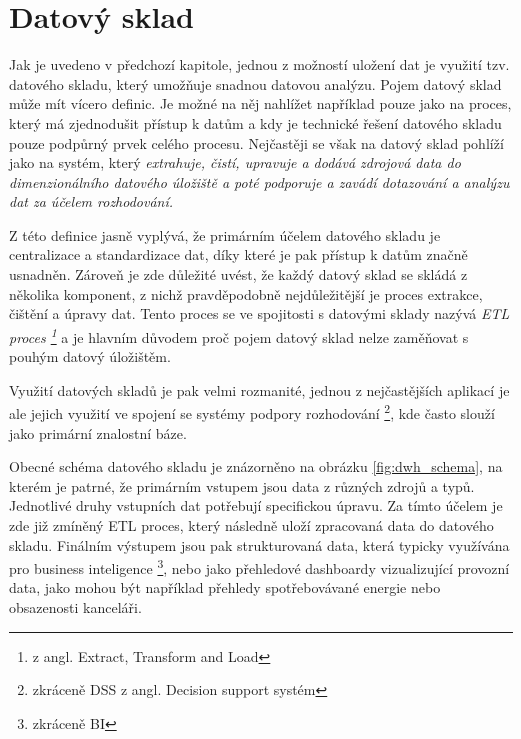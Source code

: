 \documentclass[
  digital,     %
  twoside,     %
  lof,         %
  lot,         %
]{fithesis4}
\begin{document}
\chapter{Datový sklad}
\label{dwh}
Jak je uvedeno v předchozí kapitole, jednou z možností uložení dat je využití tzv. datového skladu, který umožňuje snadnou datovou analýzu. Pojem datový sklad může mít vícero definic. Je možné na něj nahlížet například pouze jako na proces, který má zjednodušit přístup k datům a kdy je technické řešení datového skladu pouze podpůrný prvek celého procesu. Nejčastěji se však na datový sklad pohlíží jako na systém, který \emph{extrahuje, čistí, upravuje a dodává zdrojová data do dimenzionálního datového úložiště a poté podporuje a zavádí dotazování a analýzu dat za účelem rozhodování.} \parencite[s.~23]{Kimballc2004}

Z této definice jasně vyplývá, že primárním účelem datového skladu je centralizace a standardizace dat, díky které je pak přístup k datům značně usnadněn. Zároveň je zde důležité uvést, že každý datový sklad se skládá z několika komponent, z nichž pravděpodobně nejdůležitější je proces extrakce, čištění a úpravy dat. Tento proces se ve spojitosti s datovými sklady nazývá \emph{ETL proces \footnote{z angl. Extract, Transform and Load} }a je hlavním důvodem proč pojem datový sklad nelze zaměňovat s pouhým datový úložištěm. \parencite[s.~24]{Kimballc2004}

Využití datových skladů je pak velmi rozmanité, jednou z nejčastějších aplikací je ale jejich využití ve spojení se systémy podpory rozhodování \footnote{zkráceně DSS z angl. Decision support
systém}, kde často slouží jako primární znalostní báze. \parencite[s.~2]{Inmon2005}

Obecné schéma datového skladu je znázorněno na obrázku \ref{fig:dwh_schema}, na kterém je patrné, že primárním vstupem jsou data z různých zdrojů a typů. Jednotlivé druhy vstupních dat potřebují specifickou úpravu. Za tímto účelem je zde již zmíněný ETL proces, který následně uloží zpracovaná data do datového skladu. Finálním výstupem jsou pak strukturovaná data, která typicky využívána pro business inteligence \footnote{zkráceně BI}, nebo jako přehledové dashboardy vizualizující provozní data, jako mohou být například přehledy spotřebovávané energie nebo obsazenosti kanceláři.
\end{document}
